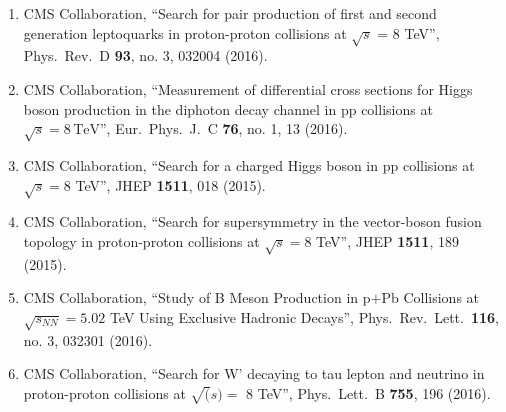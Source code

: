 \begin{itemize}
\begin{enumerate}
\item CMS Collaboration, ``Search for pair production of first and second generation leptoquarks in proton-proton collisions at $\sqrt{s}$ = 8 TeV'', Phys.\ Rev.\ D {\bf 93}, no. 3, 032004 (2016).

\item CMS Collaboration, ``Measurement of differential cross sections for Higgs boson production in the diphoton decay channel in pp collisions at $\sqrt{s}=8\,\text {TeV} $'', Eur.\ Phys.\ J.\ C {\bf 76}, no. 1, 13 (2016).

\item CMS Collaboration, ``Search for a charged Higgs boson in pp collisions at $ \sqrt{s}=8 $ TeV'', JHEP {\bf 1511}, 018 (2015).

\item CMS Collaboration, ``Search for supersymmetry in the vector-boson fusion topology in proton-proton collisions at $ \sqrt{s}=8 $ TeV'', JHEP {\bf 1511}, 189 (2015).

\item CMS Collaboration, ``Study of B Meson Production in p$+$Pb Collisions at $\sqrt{s_{NN}}=5.02$ TeV Using Exclusive Hadronic Decays'', Phys.\ Rev.\ Lett.\  {\bf 116}, no. 3, 032301 (2016).

\item CMS Collaboration, ``Search for W' decaying to tau lepton and neutrino in proton-proton collisions at $\sqrt(s) =$ 8 TeV'', Phys.\ Lett.\ B {\bf 755}, 196 (2016).


\end{enumerate}
\end{itemize}
